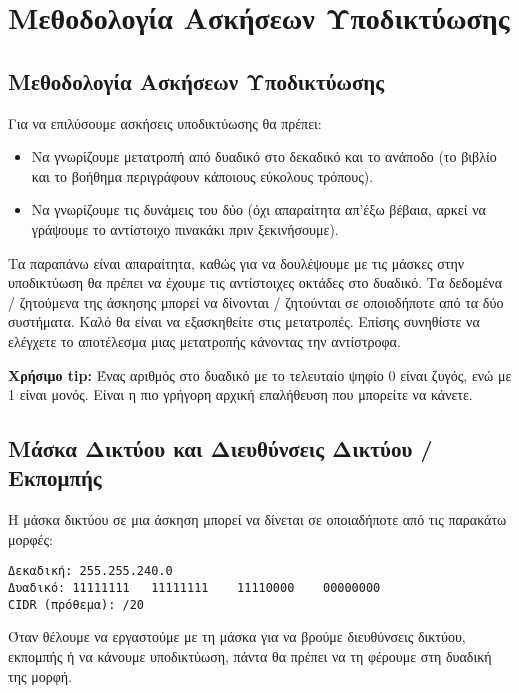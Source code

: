 \chapter{Μεθοδολογία Ασκήσεων Υποδικτύωσης}
\newpage
\section{Μεθοδολογία Ασκήσεων Υποδικτύωσης}
\label{sec:appa}
Για να επιλύσουμε ασκήσεις υποδικτύωσης θα πρέπει:

\begin{itemize}
\item Να γνωρίζουμε μετατροπή από δυαδικό στο δεκαδικό και το ανάποδο (το βιβλίο και το βοήθημα περιγράφουν κάποιους εύκολους τρόπους).
\item Να γνωρίζουμε τις δυνάμεις του δύο (όχι απαραίτητα απ’έξω βέβαια, αρκεί να γράψουμε το αντίστοιχο πινακάκι πριν ξεκινήσουμε).
\end{itemize}

Τα παραπάνω είναι απαραίτητα, καθώς για να δουλέψουμε με τις μάσκες στην υποδικτύωση θα πρέπει να έχουμε τις αντίστοιχες οκτάδες στο δυαδικό. Τα δεδομένα / ζητούμενα της άσκησης μπορεί να δίνονται / ζητούνται σε οποιοδήποτε από τα δύο συστήματα. Καλό θα είναι να εξασκηθείτε στις μετατροπές. Επίσης συνηθίστε να ελέγχετε το αποτέλεσμα μιας μετατροπής κάνοντας την αντίστροφα.

\begin{inthebox}
\textbf{Χρήσιμο tip:} Ένας αριθμός στο δυαδικό με το τελευταίο ψηφίο 0 είναι ζυγός, ενώ με 1 είναι μονός. Είναι η πιο γρήγορη αρχική επαλήθευση που μπορείτε να κάνετε.\\
\end{inthebox}

\section*{Μάσκα Δικτύου και Διευθύνσεις Δικτύου / Εκπομπής}

Η μάσκα δικτύου σε μια άσκηση μπορεί να δίνεται σε οποιαδήποτε από τις παρακάτω μορφές:

\begin{verbatim}
Δεκαδική: 255.255.240.0
Δυαδικό: 11111111	11111111	11110000	00000000
CIDR (πρόθεμα): /20
\end{verbatim}

Όταν θέλουμε να εργαστούμε με τη μάσκα για να βρούμε διευθύνσεις δικτύου, εκπομπής ή να κάνουμε υποδικτύωση, πάντα θα πρέπει να τη φέρουμε στη δυαδική της μορφή.

